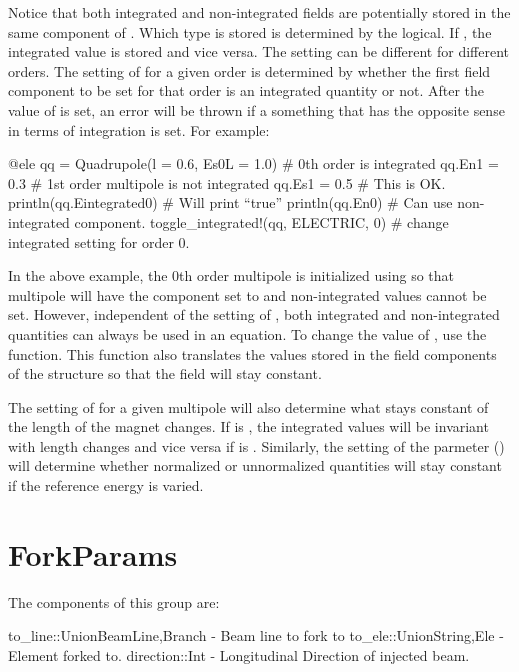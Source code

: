 Notice that both integrated
and non-integrated fields are potentially stored in the same component of .
Which type is stored is determined by the  logical. If , the integrated
value is stored and vice versa. The  setting can be different for different orders.
The setting of  for a given order is determined by whether the first field component
to be set for that order is an integrated quantity or not. After the value of  is set,
an error will be thrown if a something that has the opposite sense in terms of integration is 
set. For example:
\begin{example}
  @ele qq = Quadrupole(l = 0.6, Es0L = 1.0)  # 0th order is integrated
  qq.En1 = 0.3                  # 1st order multipole is not integrated
  qq.Es1 = 0.5                  # This is OK.
  println(qq.Eintegrated0)      # Will print ``true''
  println(qq.En0)               # Can use non-integrated component.
  toggle_integrated!(qq, ELECTRIC, 0)  # change integrated setting for order 0.
\end{example}
In the above example, the 0th order multipole is initialized using  so that
multipole will have the  component set to  and non-integrated values
cannot be set. However, independent of the setting of , both integrated and
non-integrated quantities can always be used in an equation. To change the value of ,
use the  function. This function also translates the values stored in the
field components of the structure so that the field will stay constant.

The setting of  for a given multipole will also determine what stays constant
of the length of the magnet changes. If  is , the integrated values
will be invariant with length changes and vice versa if  is . 
Similarly, the setting of the  parmeter () will determine 
whether normalized or unnormalized quantities will stay constant if the reference energy is varied.

\section{ForkParams}
\label{s:fork.g}

The components of this group are:
\begin{example}
  to_line::Union{BeamLine,Branch}   - Beam line to fork to
  to_ele::Union{String,Ele}         - Element forked to.
  direction::Int                    - Longitudinal Direction of injected beam.
\end{example}

